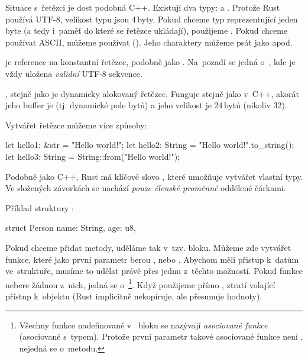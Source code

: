\documentclass[main.tex]{subfiles}
\begin{document}

Situace s~řetězci je dost podobná C++. Existují dva typy:  a .
Protože Rust používá UTF-8, velikost typu  jsou 4\,byty.
\cite[primitive.char]{ruststd} Pokud chceme typ reprezentující jeden byte (a tedy i~paměť
do které se řetězce ukládají), použijeme . Pokud chceme používat ASCII, můžeme
používat  (). Jeho charaktery můžeme psát jako 
apod. \cite[sekce\,19.3]{byexample}

 je reference na konstantní řetězec, podobně jako .
Na~pozadí se jedná o~\irust{&[u8]}, kde je vždy uložena \emph{validní} UTF-8 sekvence.

, stejně jako  je dynamicky alokovaný řetězec. Funguje
stejně jako v~C++, akorát jeho buffer je  (tj. dynamické pole bytů) a jeho
velikost je 24\,bytů (nikoliv 32). \cite[sekce\,8.2]{thebook}

Vytvářet řetězce můžeme více způsoby:

\obrazek
\begin{rustcode}
    let hello1: &str = "Hello world!";
    let hello2: String = "Hello world!".to_string();
    let hello3: String = String::from("Hello world!");
\end{rustcode}


Podobně jako C++, Rust má klíčové slovo , které umožňuje vytvářet vlastní
typy. Ve složených závorkách se nachází \emph{pouze členské proměnné} oddělené čárkami.
\cite[sekce\,5.1]{thebook}

Příklad struktury :

\obrazek
\begin{rustcode}
    struct Person {
        name: String,
        age: u8,
    }
\end{rustcode}

Pokud chceme přidat metody, uděláme tak v~tzv.  bloku. Můžeme zde vytvářet
funkce, které jako první parametr berou ,  nebo
. Abychom měli přistup k~datům ve~struktuře, musíme to udělat právě přes
jednu z~těchto možností. Pokud funkce nebere žádnou z~nich, jedná se
o~\footnote{Všechny funkce nadefinované v~ bloku
    se nazývají \emph{asociované funkce} (asociované s~typem). Protože první parametr
    takové asociované funkce není , nejedná se o~metodu.
}. Když použijeme přímo , ztratí volající přístup k~objektu (Rust implicitně
nekopíruje, ale přesunuje hodnoty). \cite[sekce\,5.3]{thebook}
\end{document}

